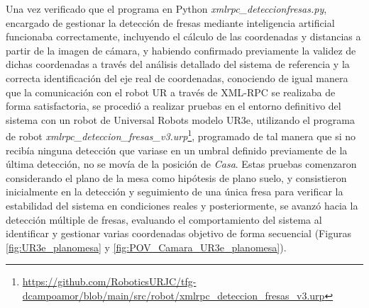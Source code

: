 \pagebreak
Una vez verificado que el programa en Python \textit{xmlrpc\_deteccionfresas.py}, encargado de gestionar la detección de fresas mediante inteligencia artificial funcionaba correctamente, incluyendo el cálculo de las coordenadas y distancias a partir de la imagen de cámara, y habiendo confirmado previamente la validez de dichas coordenadas a través del análisis detallado del sistema de referencia y la correcta identificación del eje real de coordenadas, conociendo de igual manera que la comunicación con el robot UR a través de XML-RPC se realizaba de forma satisfactoria, se procedió a realizar pruebas en el entorno definitivo del sistema con un robot de Universal Robots modelo UR3e, utilizando el programa de robot \textit{xmlrpc\_deteccion\_fresas\_v3.urp}\footnote{\url{https://github.com/RoboticsURJC/tfg-dcampoamor/blob/main/src/robot/xmlrpc_deteccion_fresas_v3.urp}}, programado de tal manera que si no recibía ninguna detección que variase en un umbral definido previamente de la última detección, no se movía de la posición de \textit{Casa}. Estas pruebas comenzaron considerando el plano de la mesa como hipótesis de plano suelo, y consistieron inicialmente en la detección y seguimiento de una única fresa para verificar la estabilidad del sistema en condiciones reales y posteriormente, se avanzó hacia la detección múltiple de fresas, evaluando el comportamiento del sistema al identificar y gestionar varias coordenadas objetivo de forma secuencial (Figuras \ref{fig:UR3e_planomesa} y \ref{fig:POV_Camara_UR3e_planomesa}).

